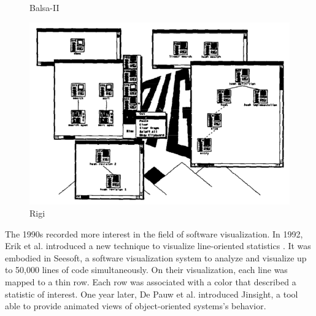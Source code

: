 \begin{figure}[H]
    \caption{Balsa-II}
  \endminipage\hfill
  \includegraphics[width=\linewidth]{Mueller1988_Rigi.png}
  \caption{Rigi}
\endminipage\hfill
  \end{figure}




The 1990s recorded more interest in the field of software visualization. 
In 1992, Erik et al. introduced a new technique to visualize line-oriented statistics \cite{Eick1992}. 
It was embodied in Seesoft, a software visualization system to analyze and visualize up to 50,000 lines of code simultaneously. 
On their visualization, each line was mapped to a thin row. Each row was associated with a color that described a statistic of interest.
One year later, De Pauw et al. \cite{DePauw1993} introduced Jinsight, a tool able to provide animated views of object-oriented systems's behavior. 


